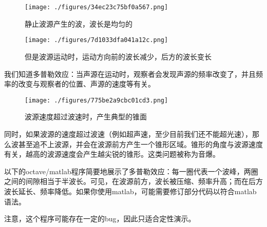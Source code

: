 
\begin{figure}[ht]
\centering
\texttt{[image: ./figures/34ec23c75bf0a567.png]}
\caption{静止波源产生的波，波长是均匀的} \label{fig_DPLDRW_1}
\end{figure}

\begin{figure}[ht]
\centering
\texttt{[image: ./figures/7d1033dfa041a12c.png]}
\caption{但是波源运动时，运动方向前的波长减少，后方的波长变长} \label{fig_DPLDRW_2}
\end{figure}

我们知道多普勒效应：当声源在运动时，观察者会发现声源的频率改变了，并且频率的改变与观察者的位置、声源的速度等有关。

\begin{figure}[ht]
\centering
\texttt{[image: ./figures/775be2a9cbc01cd3.png]}
\caption{波源速度超过波速时，产生典型的锥面} \label{fig_DPLDRW_3}
\end{figure}

同时，如果波源的速度超过波速（例如超声速，至少目前我们还不能超光速），那么波甚至追不上波源，并会在波源前方产生一个锥形区域。锥形的角度与波源速度有关，越高的波源速度会产生越尖锐的锥形。这类问题被称为音爆。

以下的octave/matlab程序简要地展示了多普勒效应：每一圈代表一个波峰，两圈之间的间隙相当于半波长。可见，在波源前方，波长被压缩、频率升高；而在后方波长延长、频率降低。如果你使用matlab，可能需要修订部分代码以符合matlab语法。

注意，这个程序可能存在一定的bug，因此只适合定性演示。

